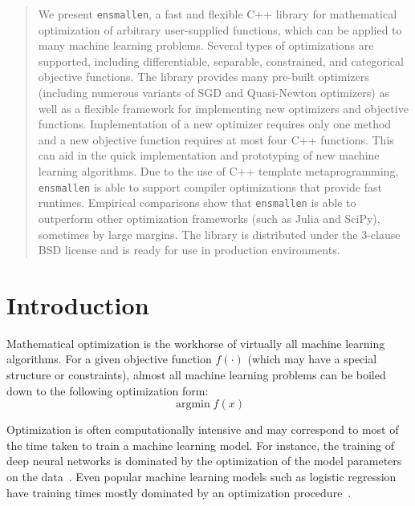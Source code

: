 \documentclass{article}
\begin{document}
\begin{abstract}
\vspace*{-0.3em}
We present {\tt ensmallen}, a fast and flexible C++ library for mathematical optimization of 
arbitrary user-supplied functions,
which can be applied to many machine learning problems.
Several types of optimizations are supported, including differentiable,
separable, constrained, and categorical objective functions.
The library provides many pre-built optimizers
(including numerous variants of SGD and Quasi-Newton optimizers)
as well as a flexible framework for implementing new optimizers and objective functions.
Implementation of a new optimizer requires only one method
and a new objective function requires at most four C++ functions. 
This can aid in the quick implementation and prototyping of new machine learning algorithms.
Due to the use of C++ template metaprogramming, {\tt ensmallen} is able to
support compiler optimizations that provide fast runtimes.
Empirical comparisons show that {\tt ensmallen} is able to outperform other
optimization frameworks (such as Julia and SciPy), sometimes by large margins.
The library is distributed under the 3-clause BSD license and is ready for use
in production environments.
\end{abstract}

\section{Introduction}

Mathematical optimization is the workhorse of virtually all machine learning
algorithms.  For a given objective function $f(\cdot)$
(which may have a special structure or constraints),
almost all machine learning problems can be boiled down
to the following optimization form:
%
\begin{equation}
\operatorname{argmin} f(x)
\end{equation}
\vspace*{-1.5em}

Optimization is often computationally intensive and may correspond
to most of the time taken to train a machine learning model.  For instance, the
training of deep neural networks is dominated by the optimization of the model
parameters on the data~\cite{schmidhuber2015deep}.
Even popular machine learning models such as logistic regression
have training times mostly dominated by an optimization procedure~\cite{kingma2015adam}.
%
\end{document}

